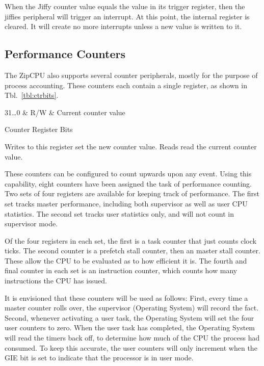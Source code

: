 \documentclass{gqtekspec}
\begin{document}
When the Jiffy counter value equals the value in its trigger register, then
the jiffies peripheral will trigger an interrupt.  At this point, the internal
register is cleared.  It will create no more interrupts unless a new value
is written to it.
\subsection{Performance Counters}

The ZipCPU also supports several counter peripherals, mostly for the purpose of
process accounting.  These counters each contain a single register, as shown
in Tbl.~\ref{tbl:ctrbits}.
\begin{table}\begin{center}
\begin{bitlist}
31\ldots 0 & R/W & Current counter value\\\hline
\end{bitlist}
\caption{Counter Register Bits}\label{tbl:ctrbits}
\end{center}\end{table}
Writes to this register set the new counter value.  Reads read the current
counter value.  

These counters can be configured to count upwards upon any event.  Using this
capability, eight counters have been assigned the task of performance counting.
Two sets of four registers are available for keeping track of performance.
The first set tracks master performance, including both supervisor as well as
user CPU statistics.  The second set tracks user statistics only, and will not
count in supervisor mode.

Of the four registers in each set, the first is a task counter that just counts
clock ticks.  The second counter is a prefetch stall counter, then an master
stall counter.  These allow the CPU to be evaluated as to how efficient it is. 
The fourth and final counter in each set is an instruction counter, which
counts how many instructions the CPU has issued.

It is envisioned that these counters will be used as follows: First, every time
a master counter rolls over, the supervisor (Operating System) will record
the fact.  Second, whenever activating a user task, the Operating System will
set the four user counters to zero.  When the user task has completed, the
Operating System will read the timers back off, to determine how much of the
CPU the process had consumed.  To keep this accurate, the user counters will
only increment when the GIE bit is set to indicate that the processor is
in user mode.
\end{document}
